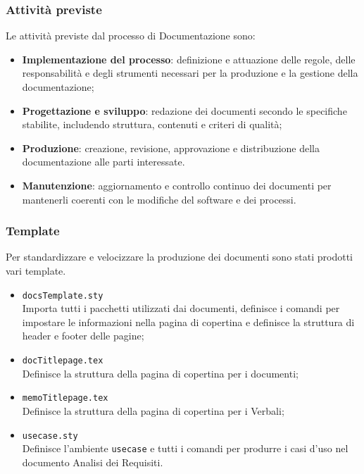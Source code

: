 \documentclass[a4paper,12pt]{article}
\begin{document}
        \subsubsection{Attività previste}
            Le attività previste dal processo di Documentazione sono:
            \begin{itemize}
                \item \textbf{Implementazione del processo}: definizione e attuazione delle regole, delle responsabilità e degli strumenti necessari per la produzione e la gestione della documentazione;
                \item \textbf{Progettazione e sviluppo}: redazione dei documenti secondo le specifiche stabilite, includendo struttura, contenuti e criteri di qualità;
                \item \textbf{Produzione}: creazione, revisione, approvazione e distribuzione della documentazione alle parti interessate.
                \item \textbf{Manutenzione}: aggiornamento e controllo continuo dei documenti per mantenerli coerenti con le modifiche del software e dei processi.
            \end{itemize}

        \subsubsection{Template}
            Per standardizzare e velocizzare la produzione dei documenti sono stati prodotti vari template.
            \begin{itemize}
                \item \verb|docsTemplate.sty|\\
                    Importa tutti i pacchetti utilizzati dai documenti, definisce i comandi per impostare le informazioni nella pagina di copertina e definisce la struttura di header e footer delle pagine;
                \item \verb|docTitlepage.tex|\\
                    Definisce la struttura della pagina di copertina per i documenti;
                \item \verb|memoTitlepage.tex|\\
                    Definisce la struttura della pagina di copertina per i Verbali;
                \item \verb|usecase.sty|\\
                    Definisce l'ambiente \verb|usecase| e tutti i comandi per produrre i casi d'uso nel documento Analisi dei Requisiti.
            \end{itemize}
\end{document}
